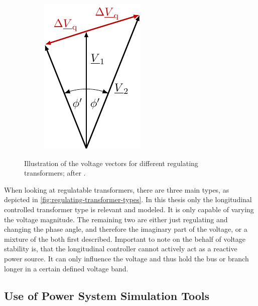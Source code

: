 \begin{figure}[htb!]
\begin{subfigure}[b]{0.29\linewidth}
        \end{subfigure}
        \begin{subfigure}[b]{0.29\linewidth}
            \centering
            \includegraphics{tikz_graphics/images/vectors_cross_regulator.pdf}
        \end{subfigure}
        \caption[Illustration of the voltage vectors for different regulating transformers]{Illustration of the voltage vectors for different regulating transformers; after \autocite{schwab_2022}.}
        \label{fig:regulating-transformer-types}
\end{figure}

When looking at regulatable transformers, there are three main types, as depicted in \autoref{fig:regulating-transformer-types}.
In this thesis only the longitudinal controlled transformer type is relevant and modeled. 
It is only capable of varying the voltage magnitude.
The remaining two are either just regulating and changing the phase angle, and therefore the imaginary part of the voltage, or a mixture of the both first described.
Important to note on the behalf of voltage stability is, that the longitudinal controller cannot actively act as a reactive power source.
It can only influence the voltage and thus hold the bus or branch longer in a certain defined voltage band.

\subsection{Use of Power System Simulation Tools}
\label{sec:simulation-tools}

